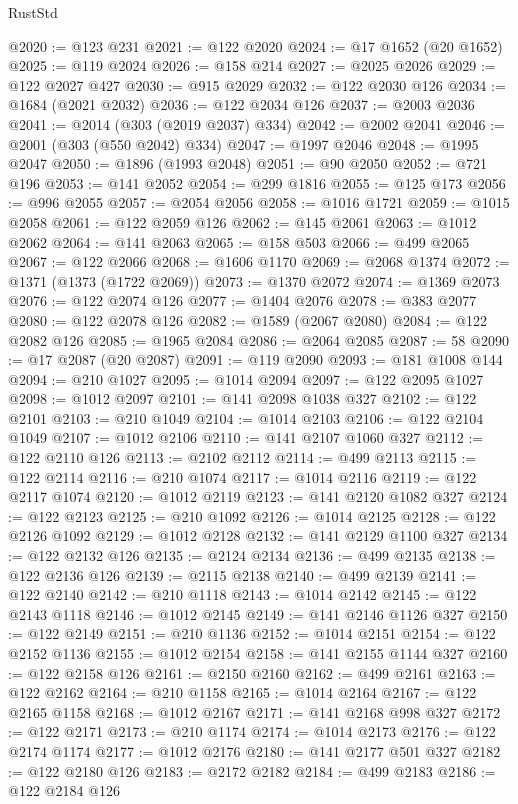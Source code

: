 \begin{lexlean}{RustStd}
\begin{coremodule}
@2020 := @123 @231
@2021 := @122 @2020
@2024 := @17 @1652 (@20 @1652)
@2025 := @119 @2024
@2026 := @158 @214
@2027 := @2025 @2026
@2029 := @122 @2027 @427
@2030 := @915 @2029
@2032 := @122 @2030 @126
@2034 := @1684 (@2021 @2032)
@2036 := @122 @2034 @126
@2037 := @2003 @2036
@2041 := @2014 (@303 (@2019 @2037) @334)
@2042 := @2002 @2041
@2046 := @2001 (@303 (@550 @2042) @334)
@2047 := @1997 @2046
@2048 := @1995 @2047
@2050 := @1896 (@1993 @2048)
@2051 := @90 @2050
@2052 := @721 @196
@2053 := @141 @2052
@2054 := @299 @1816
@2055 := @125 @173
@2056 := @996 @2055
@2057 := @2054 @2056
@2058 := @1016 @1721
@2059 := @1015 @2058
@2061 := @122 @2059 @126
@2062 := @145 @2061
@2063 := @1012 @2062
@2064 := @141 @2063
@2065 := @158 @503
@2066 := @499 @2065
@2067 := @122 @2066
@2068 := @1606 @1170
@2069 := @2068 @1374
@2072 := @1371 (@1373 (@1722 @2069))
@2073 := @1370 @2072
@2074 := @1369 @2073
@2076 := @122 @2074 @126
@2077 := @1404 @2076
@2078 := @383 @2077
@2080 := @122 @2078 @126
@2082 := @1589 (@2067 @2080)
@2084 := @122 @2082 @126
@2085 := @1965 @2084
@2086 := @2064 @2085
@2087 := 58
@2090 := @17 @2087 (@20 @2087)
@2091 := @119 @2090
@2093 := @181 @1008 @144
@2094 := @210 @1027
@2095 := @1014 @2094
@2097 := @122 @2095 @1027
@2098 := @1012 @2097
@2101 := @141 @2098 @1038 @327
@2102 := @122 @2101
@2103 := @210 @1049
@2104 := @1014 @2103
@2106 := @122 @2104 @1049
@2107 := @1012 @2106
@2110 := @141 @2107 @1060 @327
@2112 := @122 @2110 @126
@2113 := @2102 @2112
@2114 := @499 @2113
@2115 := @122 @2114
@2116 := @210 @1074
@2117 := @1014 @2116
@2119 := @122 @2117 @1074
@2120 := @1012 @2119
@2123 := @141 @2120 @1082 @327
@2124 := @122 @2123
@2125 := @210 @1092
@2126 := @1014 @2125
@2128 := @122 @2126 @1092
@2129 := @1012 @2128
@2132 := @141 @2129 @1100 @327
@2134 := @122 @2132 @126
@2135 := @2124 @2134
@2136 := @499 @2135
@2138 := @122 @2136 @126
@2139 := @2115 @2138
@2140 := @499 @2139
@2141 := @122 @2140
@2142 := @210 @1118
@2143 := @1014 @2142
@2145 := @122 @2143 @1118
@2146 := @1012 @2145
@2149 := @141 @2146 @1126 @327
@2150 := @122 @2149
@2151 := @210 @1136
@2152 := @1014 @2151
@2154 := @122 @2152 @1136
@2155 := @1012 @2154
@2158 := @141 @2155 @1144 @327
@2160 := @122 @2158 @126
@2161 := @2150 @2160
@2162 := @499 @2161
@2163 := @122 @2162
@2164 := @210 @1158
@2165 := @1014 @2164
@2167 := @122 @2165 @1158
@2168 := @1012 @2167
@2171 := @141 @2168 @998 @327
@2172 := @122 @2171
@2173 := @210 @1174
@2174 := @1014 @2173
@2176 := @122 @2174 @1174
@2177 := @1012 @2176
@2180 := @141 @2177 @501 @327
@2182 := @122 @2180 @126
@2183 := @2172 @2182
@2184 := @499 @2183
@2186 := @122 @2184 @126

\end{coremodule}
\end{lexlean}
